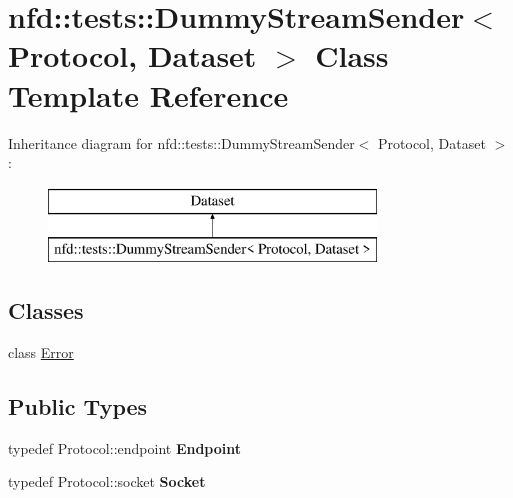 \hypertarget{classnfd_1_1tests_1_1DummyStreamSender}{}\section{nfd\+:\+:tests\+:\+:Dummy\+Stream\+Sender$<$ Protocol, Dataset $>$ Class Template Reference}
\label{classnfd_1_1tests_1_1DummyStreamSender}
Inheritance diagram for nfd\+:\+:tests\+:\+:Dummy\+Stream\+Sender$<$ Protocol, Dataset $>$\+:\begin{figure}[H]
\begin{center}
\leavevmode
\includegraphics[height=2.000000cm]{classnfd_1_1tests_1_1DummyStreamSender}
\end{center}
\end{figure}
\subsection*{Classes}
\begin{DoxyCompactItemize}
\item 
class \hyperlink{classnfd_1_1tests_1_1DummyStreamSender_1_1Error}{Error}
\end{DoxyCompactItemize}
\subsection*{Public Types}
\begin{DoxyCompactItemize}
\item 
typedef Protocol\+::endpoint {\bfseries Endpoint}\hypertarget{classnfd_1_1tests_1_1DummyStreamSender_ac919ed3544fae6040fc9bcdb4045e14f}{}\label{classnfd_1_1tests_1_1DummyStreamSender_ac919ed3544fae6040fc9bcdb4045e14f}

\item 
typedef Protocol\+::socket {\bfseries Socket}\hypertarget{classnfd_1_1tests_1_1DummyStreamSender_ac546c74f3598ef74ab7c6534d9b761a5}{}\label{classnfd_1_1tests_1_1DummyStreamSender_ac546c74f3598ef74ab7c6534d9b761a5}

\end{DoxyCompactItemize}
